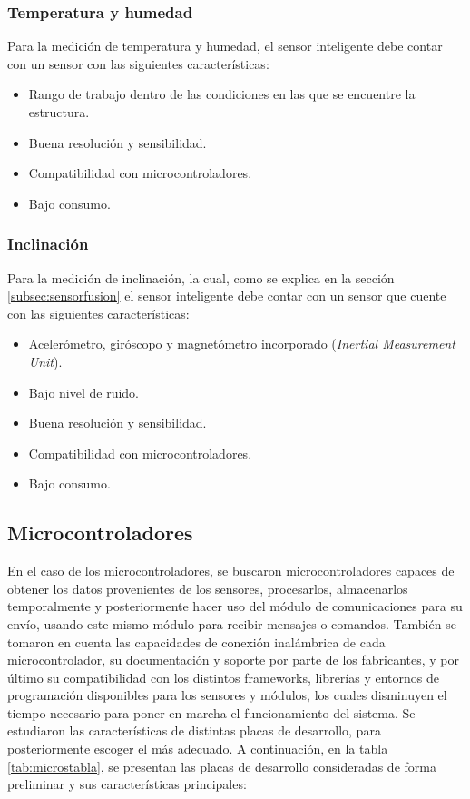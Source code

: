 \subsubsection{Temperatura y humedad}

Para la medición de temperatura y humedad, el sensor inteligente debe contar con un sensor con las siguientes características:

\begin{itemize}
    \item Rango de trabajo dentro de las condiciones en las que se encuentre la estructura.
    \item Buena resolución y sensibilidad.
    \item Compatibilidad con microcontroladores.
    \item Bajo consumo.
\end{itemize}

\subsubsection{Inclinación}

Para la medición de inclinación, la cual, como se explica en la sección \ref{subsec:sensorfusion} el sensor inteligente debe contar con un sensor que cuente con las siguientes características:

\begin{itemize}
    \item Acelerómetro, giróscopo y magnetómetro incorporado (\textit{Inertial Measurement Unit}).
    \item Bajo nivel de ruido.
    \item Buena resolución y sensibilidad.
    \item Compatibilidad con microcontroladores.
    \item Bajo consumo.
\end{itemize}

\subsection{Microcontroladores}

En el caso de los microcontroladores, se buscaron microcontroladores capaces de obtener los datos provenientes de los sensores, procesarlos, almacenarlos temporalmente y posteriormente hacer uso del módulo de comunicaciones para su envío, usando este mismo módulo para recibir mensajes o comandos. También se tomaron en cuenta las capacidades de conexión inalámbrica de cada microcontrolador, su documentación y soporte por parte de los fabricantes, y por último su compatibilidad con los distintos frameworks, librerías y entornos de programación disponibles para los sensores y módulos, los cuales disminuyen el tiempo necesario para poner en marcha el funcionamiento del sistema. Se estudiaron las características de distintas placas de desarrollo, para posteriormente escoger el más adecuado. A continuación, en la tabla \ref{tab:microstabla}, se presentan las placas de desarrollo consideradas de forma preliminar y sus características principales:

